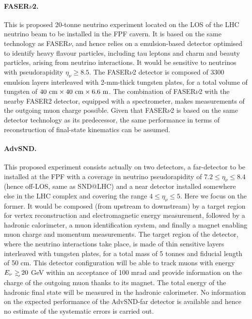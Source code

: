 \paragraph{FASER$\nu$2.}
%
This is proposed 20-tonne neutrino experiment located on the LOS
of the LHC neutrino beam to be installed in the FPF cavern.
%
It is based on the same technology as FASER$\nu$, and hence
relies on a emulsion-based detector optimised to identify heavy flavour particles, including
tau leptons and charm and beauty particles, arising from neutrino interactions.
%
It would be sensitive to neutrinos with pseudorapidity $\eta_\nu \ge 8.5$.
%
The FASER$\nu$2 detector is composed of 3300 emulsion layers interleaved with 2-mm-thick tungsten plates,
for a total volume of  tungsten of $40~\rm{cm} \times 40~\rm{cm} \times 6.6~{\rm m}$.
%
The combination of FASER$\nu$2  with the nearby FASER2 detector, equipped with a spectrometer, makes measurements of the outgoing muon charge possible.
%
Given that FASER$\nu$2 is based on the same detector technology
as its predecessor, the same performance in terms of reconstruction
of final-state kinematics can be assumed.

 \paragraph{AdvSND.}
 This proposed experiment consists actually on  two detectors, a far-detector to be installed
 at the FPF with a coverage in neutrino pseudorapidity of $7.2 \le \eta_\nu \le 8.4$
 (hence off-LOS, same as SND@LHC) and a near detector installed somewhere else in the LHC
 complex and covering the range $4 \le \eta_\nu \le 5$.
Here we focus on the former.
 It would be
 composed (from upstream to downstream) by a target region
 for  vertex reconstruction and electromagnetic energy measurement, followed  by a hadronic calorimeter, a  muon 
 identification system, and finally  a magnet enabling muon charge and momentum measurements.
 The target region of the detector, where the neutrino interactions take place, is made of thin sensitive layers 
 interleaved with tungsten plates, for a total mass of 5 tonnes and fiducial length of 50 cm.
 This detector configuration will be able to track muons with energy $E_\nu \gsim 20$ GeV
 within an acceptance of 100 mrad and provide information on the charge
 of the  outgoing muon thanks to its magnet.
 The total energy of the hadronic final state will be measured
 in the hadronic calorimeter.
 No information on the expected performance of the AdvSND-far detector
 is available and hence no estimate of the systematic errors
 is carried out.

